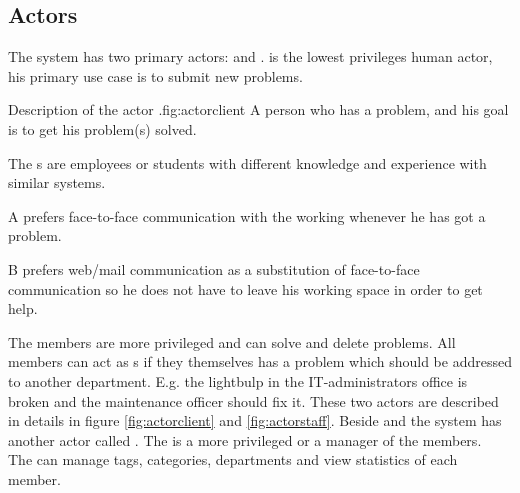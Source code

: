 \subsection{Actors}
\label{sec:actors}


The system has two primary actors:   \aclient{} and \astaff. \aclient[c] is the lowest privileges human actor, his primary use case is to submit new problems. \\

\begin{sadlist}[h]{\Aclient}{Description of the actor \aclient.}{fig:actorclient}
 A person who has a problem, and his goal is to get his problem(s) solved.

 The \aclient{}s are employees or students with different knowledge and experience with similar systems.%

 \Aclient{} A prefers face-to-face communication with the working \astaff{} whenever he has got a problem. 

\aclient[c] B prefers web/mail communication as a substitution of face-to-face communication so he does not have to leave his working space in order to get help. 

\end{sadlist} 


The \astaff{} members are more privileged and can solve and delete problems. 
All \astaff{} members can act as \aclient{}s if they themselves has a problem which should be addressed to another department. 
E.g. the lightbulp in the IT-administrators office is broken and the maintenance officer should fix it. 
These two actors are described in details in figure \ref{fig:actorclient} and \ref{fig:actorstaff}. 
Beside \astaff{} and \aclient{} the system has another actor called \sadmin{}. 
The \sadmin{} is a more privileged \astaff{} or a manager of the \astaff members. \\

The \sadmin{} can manage tags, categories, departments and view statistics of each \astaff member.

